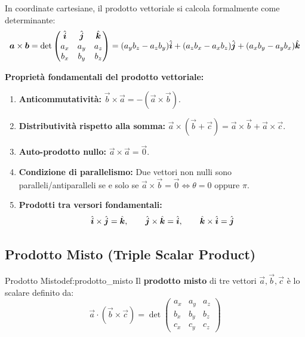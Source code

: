 In coordinate cartesiane, il prodotto vettoriale si calcola formalmente come determinante:
\begin{equation}
    \bm{a}\times\bm{b} = \det \begin{pmatrix} \hat{\bm{i}} & \hat{\bm{j}} & \hat{\bm{k}} \\ a_x & a_y & a_z \\ b_x & b_y & b_z \end{pmatrix} = (a_y b_z - a_z b_y)\hat{\bm{i}} + (a_z b_x - a_x b_z)\hat{\bm{j}} + (a_x b_y - a_y b_x)\hat{\bm{k}}
\end{equation}

\textbf{Proprietà fondamentali del prodotto vettoriale:}
\begin{enumerate}
    \item \textbf{Anticommutatività:} $\vec{b}\times\vec{a} = -(\vec{a}\times\vec{b})$.
    \item \textbf{Distributività rispetto alla somma:} $\vec{a}\times(\vec{b} + \vec{c}) = \vec{a}\times\vec{b} + \vec{a}\times\vec{c}$.
    \item \textbf{Auto-prodotto nullo:} $\vec{a}\times\vec{a} = \vec{0}$.
    \item \textbf{Condizione di parallelismo:} Due vettori non nulli sono paralleli/antiparalleli se e solo se $\vec{a}\times\vec{b} = \vec{0} \iff \theta = 0 \text{ oppure } \pi$.
    \item \textbf{Prodotti tra versori fondamentali:}
    \begin{equation}
        \hat{\bm{i}}\times\hat{\bm{j}} = \hat{\bm{k}}, \qquad \hat{\bm{j}}\times\hat{\bm{k}} = \hat{\bm{i}}, \qquad \hat{\bm{k}}\times\hat{\bm{i}} = \hat{\bm{j}}
    \end{equation}
\end{enumerate}

\subsection{Prodotto Misto (Triple Scalar Product)}

\begin{definizione}{Prodotto Misto}{def:prodotto_misto}
Il \textbf{prodotto misto} di tre vettori $\vec{a}, \vec{b}, \vec{c}$ è lo scalare definito da:
\begin{equation}
    \vec{a}\cdot(\vec{b}\times\vec{c}) = \det \begin{pmatrix} a_x & a_y & a_z \\ b_x & b_y & b_z \\ c_x & c_y & c_z \end{pmatrix}
\end{equation}
\end{definizione}

